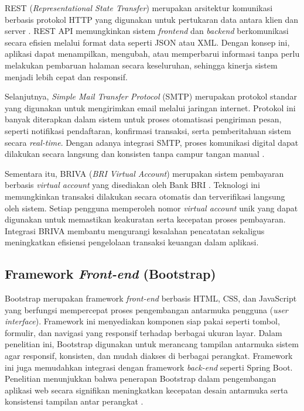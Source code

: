REST (\textit{Representational State Transfer}) merupakan arsitektur komunikasi berbasis protokol HTTP yang digunakan untuk pertukaran data antara klien dan server \cite{novianto2023analisis}. REST API memungkinkan sistem \textit{frontend} dan \textit{backend} berkomunikasi secara efisien melalui format data seperti JSON atau XML. Dengan konsep ini, aplikasi dapat menampilkan, mengubah, atau memperbarui informasi tanpa perlu melakukan pembaruan halaman secara keseluruhan, sehingga kinerja sistem menjadi lebih cepat dan responsif.\par

Selanjutnya, \textit{Simple Mail Transfer Protocol} (SMTP) merupakan protokol standar yang digunakan untuk mengirimkan email melalui jaringan internet. Protokol ini banyak diterapkan dalam sistem untuk proses otomatisasi pengiriman pesan, seperti notifikasi pendaftaran, konfirmasi transaksi, serta pemberitahuan sistem secara \textit{real-time}. Dengan adanya integrasi SMTP, proses komunikasi digital dapat dilakukan secara langsung dan konsisten tanpa campur tangan manual \cite{mukhtar2020analisa}.\par

Sementara itu, BRIVA (\textit{BRI Virtual Account}) merupakan sistem pembayaran berbasis \textit{virtual account} yang disediakan oleh Bank BRI \cite{wahyu2021design}. Teknologi ini memungkinkan transaksi dilakukan secara otomatis dan terverifikasi langsung oleh sistem. Setiap pengguna memperoleh nomor \textit{virtual account} unik yang dapat digunakan untuk memastikan keakuratan serta kecepatan proses pembayaran. Integrasi BRIVA membantu mengurangi kesalahan pencatatan sekaligus meningkatkan efisiensi pengelolaan transaksi keuangan dalam aplikasi.\par

\subsection{Framework \textit{Front-end} (Bootstrap)} \label{II.Bootstrap}
Bootstrap merupakan framework \textit{front-end} berbasis HTML, CSS, dan JavaScript yang berfungsi mempercepat proses pengembangan antarmuka pengguna (\textit{user interface}). Framework ini menyediakan komponen siap pakai seperti tombol, formulir, dan navigasi yang responsif terhadap berbagai ukuran layar. Dalam penelitian ini, Bootstrap digunakan untuk merancang tampilan antarmuka sistem agar responsif, konsisten, dan mudah diakses di berbagai perangkat. Framework ini juga memudahkan integrasi dengan framework \textit{back-end} seperti Spring Boot. Penelitian menunjukkan bahwa penerapan Bootstrap dalam pengembangan aplikasi web secara signifikan meningkatkan kecepatan desain antarmuka serta konsistensi tampilan antar perangkat \cite{kaur2023evaluating}.\par

